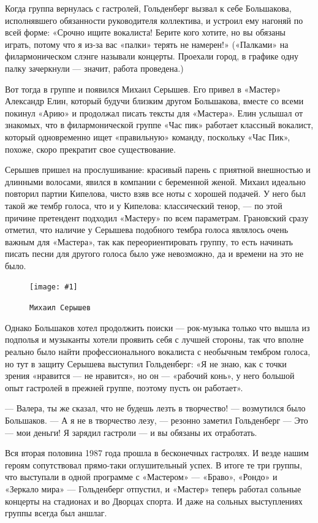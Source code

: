 \documentclass[16pt,a5paper]{book}
\newcommand{\myincludegraphics}[1]{\texttt{[image: \#1]}}
\begin{document}
Когда группа вернулась с гастролей, Гольденберг вызвал к себе Большакова, исполнявшего обязанности руководителя
коллектива, и устроил ему нагоняй по всей форме: «Срочно ищите вокалиста! Берите кого хотите, но вы обязаны играть,
потому что я из-за вас «палки» терять не намерен!» («Палками» на филармоническом слэнге называли концерты. Проехали
город, в графике одну палку зачеркнули — значит, работа проведена.)

Вот тогда в группе и появился Михаил Серышев. Его привел в «Мастер» Александр Елин, который будучи близким другом
Большакова, вместе со всеми покинул «Арию» и продолжал писать тексты для «Мастера». Елин услышал от знакомых, что в
филармонической группе «Час пик» работает классный вокалист, который одновременно ищет «правильную» команду, поскольку
«Час Пик», похоже, скоро прекратит свое существование.

Серышев пришел на прослушивание: красивый парень с приятной внешностью и длинными волосами, явился в компании с
беременной женой. Михаил идеально повторил партии Кипелова, чисто взяв все ноты с хорошей подачей. У него был такой же
тембр голоса, что и у Кипелова: классический тенор, — по этой причине претендент подходил «Мастеру» по всем параметрам.
Грановский сразу отметил, что наличие у Серышева подобного тембра голоса являлось очень важным для «Мастера», так как
переориентировать группу, то есть начинать писать песни для другого голоса было уже невозможно, да и времени на это не
было.

\begin{figure}
    \centering
    \myincludegraphics{Image20}
    \caption{\texttt{Михаил Серышев}}
\end{figure}

Однако Большаков хотел продолжить поиски — рок-музыка только что вышла из подполья и музыканты хотели проявить себя с
лучшей стороны, так что вполне реально было найти профессионального вокалиста с необычным тембром голоса, но тут в
защиту Серышева выступил Гольденберг: «Я не знаю, как с точки зрения «нравится — не нравится», но он — «рабочий конь», у
него большой опыт гастролей в прежней группе, поэтому пусть он работает».

— Валера, ты же сказал, что не будешь лезть в творчество! — возмутился было Большаков.
— А я не в творчество лезу, — резонно заметил Гольденберг — Это — мои деньги! Я зарядил гастроли — и вы обязаны их
отработать.

Вся вторая половина 1987 года прошла в бесконечных гастролях. И везде нашим героям сопутствовал прямо-таки оглушительный
успех. В итоге те три группы, что выступали в одной программе с «Мастером» — «Браво», «Рондо» и «Зеркало мира» —
Гольденберг отпустил, и «Мастер» теперь работал сольные концерты на стадионах и во Дворцах спорта. И даже на сольных
выступлениях группы всегда был аншлаг.
\end{document}
